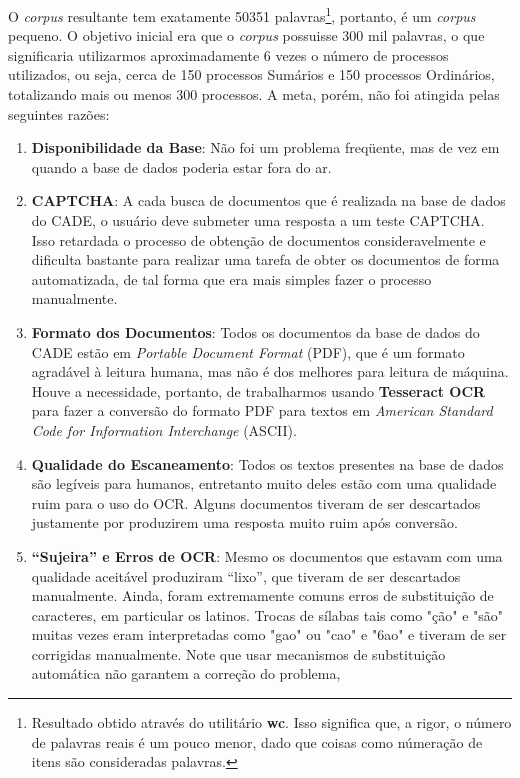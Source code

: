 \documentclass[11pt]{report}
\newcommand{\quotes}[1]{``#1''}
\begin{document}
O \textit{corpus} resultante tem exatamente 50351 palavras\footnote[8]{Resultado obtido através do utilitário \textbf{wc}. Isso significa que, a rigor, o número de palavras
reais é um pouco menor, dado que coisas como númeração de itens são consideradas palavras.}, portanto, é um \textit{corpus} pequeno. O objetivo inicial era que o \textit{corpus}
possuisse 300 mil palavras, o que significaria utilizarmos aproximadamente 6 vezes o número de processos utilizados, ou seja, cerca de 150 processos Sumários e
150 processos Ordinários, totalizando mais ou menos 300 processos. A meta, porém, não foi atingida pelas seguintes razões:

\begin{enumerate}[label=\textbf{\arabic*.}]
  \item \textbf{Disponibilidade da Base}: Não foi um problema freqüente, mas de vez em quando a base de dados poderia estar fora do ar.
  \item \textbf{CAPTCHA}: A cada busca de documentos que é realizada na base de dados do CADE, o usuário deve submeter uma resposta a um teste CAPTCHA. Isso
  retardada o processo de obtenção de documentos consideravelmente e dificulta bastante para realizar uma tarefa de obter os documentos de forma automatizada, de tal
  forma que era mais simples fazer o processo manualmente.
  \item \textbf{Formato dos Documentos}: Todos os documentos da base de dados do CADE estão em \textit{Portable Document Format} (PDF), que é um formato agradável à
  leitura humana, mas não é dos melhores para leitura de máquina. Houve a necessidade, portanto,  de trabalharmos usando \textbf{Tesseract OCR} para fazer a conversão do
  formato PDF para textos em \textit{American Standard Code for Information Interchange} (ASCII).
  \item \textbf{Qualidade do Escaneamento}: Todos os textos presentes na base de dados são legíveis para humanos, entretanto muito deles estão com uma qualidade ruim para
  o uso do OCR. Alguns documentos tiveram de ser descartados justamente por produzirem uma resposta muito ruim após conversão.
  \item \textbf{\quotes{Sujeira} e Erros de OCR}: Mesmo os documentos que estavam com uma qualidade aceitável produziram \quotes{lixo}, que tiveram de ser descartados
  manualmente. Ainda, foram extremamente comuns erros de substituição de caracteres, em particular os latinos. Trocas de sílabas tais como "ção" e "são" muitas vezes eram
  interpretadas como "gao" ou "cao" e "6ao" e tiveram de ser corrigidas manualmente. Note que usar mecanismos de substituição automática não garantem a correção do problema,

\end{enumerate}
\end{document}
